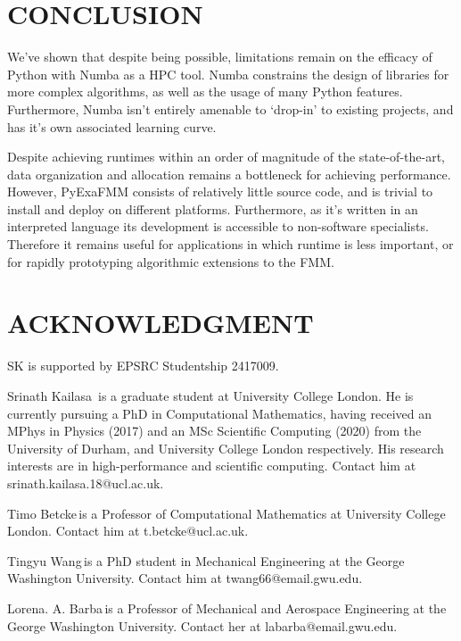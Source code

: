 \documentclass{IEEEcsmag}
\begin{document}
\section{CONCLUSION}

We've shown that despite being possible, limitations remain on the efficacy of Python with Numba as a HPC tool. Numba constrains the design of libraries for more complex algorithms, as well as the usage of many Python features. Furthermore, Numba isn't entirely amenable to `drop-in' to existing projects, and has it's own associated learning curve.

Despite achieving runtimes within an order of magnitude of the state-of-the-art, data organization and allocation remains a bottleneck for achieving performance. However, PyExaFMM consists of relatively little source code, and is trivial to install and deploy on different platforms. Furthermore, as it's written in an interpreted language its development is accessible to non-software specialists. Therefore it remains useful for applications in which runtime is less important, or for rapidly prototyping algorithmic extensions to the FMM.

\section{ACKNOWLEDGMENT}

SK is supported by EPSRC Studentship 2417009.




\begin{IEEEbiography}{Srinath Kailasa}{\,} is a graduate student at University College London. He is currently pursuing a PhD in Computational Mathematics, having received an MPhys in Physics (2017) and an MSc Scientific Computing (2020) from the University of Durham, and University College London respectively. His research interests are in high-performance and scientific computing. Contact him at srinath.kailasa.18@ucl.ac.uk.
\end{IEEEbiography}

\begin{IEEEbiography}{Timo Betcke}{\,}is a Professor of Computational Mathematics at University College London. Contact him at t.betcke@ucl.ac.uk.
\end{IEEEbiography}

\begin{IEEEbiography}{Tingyu Wang}{\,}is a PhD student in Mechanical Engineering at the George Washington University. Contact him at twang66@email.gwu.edu.
\end{IEEEbiography}

\begin{IEEEbiography}{Lorena. A. Barba}{\,}is a Professor of Mechanical and Aerospace Engineering at the George Washington University.  Contact her at labarba@email.gwu.edu.
\end{IEEEbiography}
\end{document}
